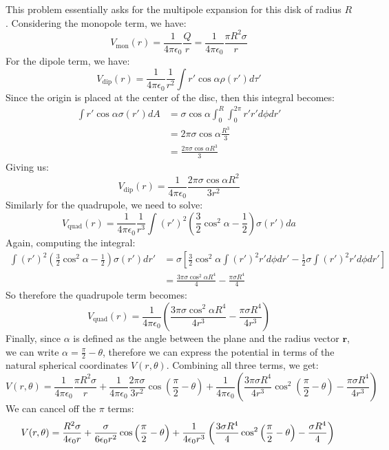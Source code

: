 \documentclass[10pt]{article}
\begin{document}
	\begin{solution}
		This problem essentially asks for the multipole expansion for this disk of radius $R$. Considering the 
		monopole term, we have:
		\[
			V_{\text{mon}}(r) = \frac{1}{4\pi\epsilon_0}\frac{Q}{r} = 
			\frac{1}{4\pi \epsilon_0}\frac{\pi R^2 \sigma}{r}
		\] 
		For the dipole term, we have:
		\[
			V_{\text{dip}}(r) = \frac{1}{4\pi\epsilon_0}\frac{1}{r^2} \int r' \cos \alpha \rho(r') d\tau'
		\] 
		Since the origin is placed at the center of the disc, then this integral becomes: 
		\begin{align*}
			\int r' \cos \alpha \sigma(r') dA &= \sigma \cos \alpha \int_0^R \int_0^{2\pi} r' r' d\phi dr'\\
											  &= 2\pi \sigma \cos \alpha \frac{R^3}{3}\\
			&= \frac{2\pi \sigma \cos \alpha R^3}{3} 
		\end{align*}
		Giving us: 
		\[
			V_{\text{dip}}(r) = \frac{1}{4\pi \epsilon_0}\frac{2\pi \sigma \cos \alpha R^2}{3r^2}
		\] 
		Similarly for the quadrupole, we need to solve:
		\[
			V_{\text{quad}}(r) = \frac{1}{4\pi \epsilon_0}\frac{1}{r^3}\int (r')^2 \left(\frac{3}{2}\cos^2 \alpha
			- \frac{1}{2}\right)\sigma(r') da
		\] 
		Again, computing the integral:
		\begin{align*}
			\int (r')^2 \left( \frac{3}{2}\cos^2 \alpha - \frac{1}{2} \right) \sigma(r') dr' &= \sigma \left[ 
			\frac{3}{2}\cos^2 \alpha \int (r')^2 r' d\phi dr'- 
		\frac{1}{2} \sigma \int(r')^2 r' d\phi dr'\right] \\
			&= \frac{3\pi \sigma \cos^2 \alpha R^4}{4} - \frac{\pi \sigma R^4}{4}
		\end{align*}
		So therefore the quadrupole term becomes: 
		\[
			V_{\text{quad}}(r) = \frac{1}{4\pi \epsilon_0}\left( \frac{3\pi \sigma \cos^2 \alpha  R^4}{4r^3} -
			\frac{\pi \sigma R^4}{4r^3} \right) 
		\] 
		Finally, since $\alpha$ is defined as the angle between the plane and the radius vector $\mathbf r$, 
		we can write $\alpha = \frac{\pi}{2} - \theta$, therefore we can express the potential in terms of the
		natural spherical coordinates $V(r, \theta)$. Combining all three terms, we get:
		\[
		V(r, \theta) = \frac{1}{4\pi \epsilon_0}\frac{\pi R^2 \sigma}{r} + \frac{1}{4\pi \epsilon_0}\frac{2\pi\sigma}{3r^2}\cos\left( \frac{\pi}{2} - \theta \right) + \frac{1}{4\pi \epsilon_0}\left( \frac{3\pi\sigma R^4}{4r^3}\cos^2\left( \frac{\pi}{2} - \theta \right) - \frac{\pi \sigma R^4}{4r^3} \right) 
		\] 
		We can cancel off the $\pi$ terms:
		\[
		 V(r, \theta) = \frac{R^2 \sigma}{4 \epsilon_0r} +
		 \frac{\sigma}{6 \epsilon_0 r^2}\cos\left( \frac{\pi}{2} -
			\theta \right)  + \frac{1}{4\epsilon_0 r^3}\left(\frac{3 \sigma R^4}{4} \cos^2\left( \frac{\pi}{2}- 
			\theta \right) - \frac{\sigma R^4}{4}\right)  \\
		\]
	\end{solution}
\end{document}

